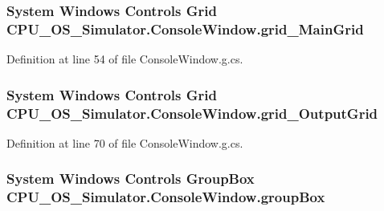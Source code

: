 \subsubsection[{grid\+\_\+\+Main\+Grid}]{\setlength{\rightskip}{0pt plus 5cm}System Windows Controls Grid C\+P\+U\+\_\+\+O\+S\+\_\+\+Simulator.\+Console\+Window.\+grid\+\_\+\+Main\+Grid\hspace{0.3cm}{\ttfamily [package]}}\label{class_c_p_u___o_s___simulator_1_1_console_window_a28c9b155f3287ca00079175dc675eee4}


Definition at line 54 of file Console\+Window.\+g.\+cs.

\hypertarget{class_c_p_u___o_s___simulator_1_1_console_window_afef6d481c8b608672b98da16721143b0}{}
\subsubsection[{grid\+\_\+\+Output\+Grid}]{\setlength{\rightskip}{0pt plus 5cm}System Windows Controls Grid C\+P\+U\+\_\+\+O\+S\+\_\+\+Simulator.\+Console\+Window.\+grid\+\_\+\+Output\+Grid\hspace{0.3cm}{\ttfamily [package]}}\label{class_c_p_u___o_s___simulator_1_1_console_window_afef6d481c8b608672b98da16721143b0}


Definition at line 70 of file Console\+Window.\+g.\+cs.

\hypertarget{class_c_p_u___o_s___simulator_1_1_console_window_ad2d026ec9701c1b7c36dc5038927f1ab}{}
\subsubsection[{group\+Box}]{\setlength{\rightskip}{0pt plus 5cm}System Windows Controls Group\+Box C\+P\+U\+\_\+\+O\+S\+\_\+\+Simulator.\+Console\+Window.\+group\+Box\hspace{0.3cm}{\ttfamily [package]}}\label{class_c_p_u___o_s___simulator_1_1_console_window_ad2d026ec9701c1b7c36dc5038927f1ab}


